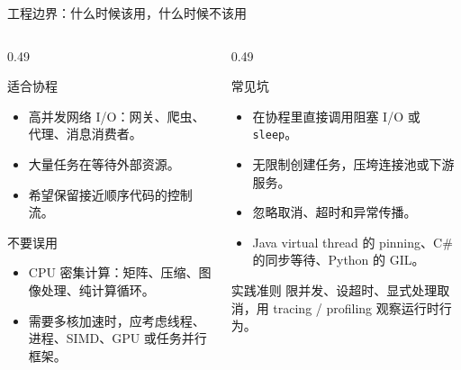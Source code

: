 \documentclass[UTF8,aspectratio=169,11pt]{ctexbeamer}
\begin{document}
\begin{frame}{工程边界：什么时候该用，什么时候不该用}
  \begin{columns}[T,onlytextwidth]
    \begin{column}{0.49\textwidth}
      \begin{block}{适合协程}
        \begin{itemize}
          \item 高并发网络 I/O：网关、爬虫、代理、消息消费者。
          \item 大量任务在等待外部资源。
          \item 希望保留接近顺序代码的控制流。
        \end{itemize}
      \end{block}
      \begin{block}{不要误用}
        \begin{itemize}
          \item CPU 密集计算：矩阵、压缩、图像处理、纯计算循环。
          \item 需要多核加速时，应考虑线程、进程、SIMD、GPU 或任务并行框架。
        \end{itemize}
      \end{block}
    \end{column}
    \begin{column}{0.49\textwidth}
      \begin{block}{常见坑}
        \begin{itemize}
          \item 在协程里直接调用阻塞 I/O 或 \texttt{sleep}。
          \item 无限制创建任务，压垮连接池或下游服务。
          \item 忽略取消、超时和异常传播。
          \item Java virtual thread 的 pinning、C\# 的同步等待、Python 的 GIL。
        \end{itemize}
      \end{block}
      \begin{block}{实践准则}
        限并发、设超时、显式处理取消，用 tracing / profiling 观察运行时行为。
      \end{block}
    \end{column}
  \end{columns}
\end{frame}
\end{document}
